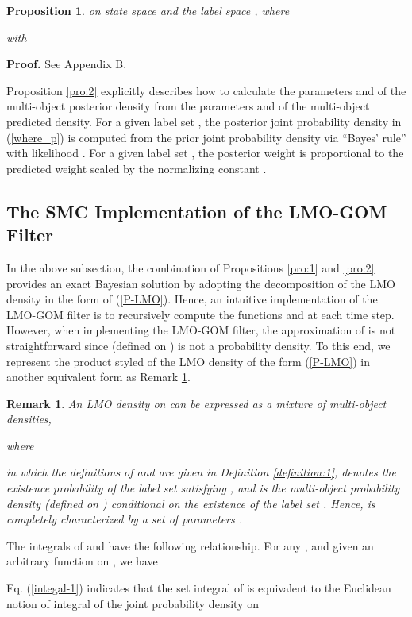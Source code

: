 \documentclass[journal]{IEEEtran}
\newtheorem{Pro}{Proposition}
\newtheorem{Rem}{Remark}
\newcommand{\proproof}[1]{\noindent\textbf{Proof. } See Appendix #1.}
\begin{document}
{\begin{Pro}
on state space  and the label space ,
where
 
with
   
\end{Pro}

\proproof{B}

Proposition \ref{pro:2} explicitly describes how to calculate the parameters  and   of the  multi-object posterior density from the parameters  and  of the multi-object  predicted   density. For a given label set , the posterior joint probability density  in (\ref{where_p}) is computed from the prior joint probability density     via ``Bayes' rule'' with likelihood . For a given label set , the posterior weight  is  proportional to the predicted weight   scaled by the normalizing constant .


 \subsection{The SMC Implementation of the LMO-GOM Filter}
In the above subsection, the combination of Propositions \ref{pro:1} and \ref{pro:2} provides an exact Bayesian solution  by adopting the decomposition of  the LMO  density  in the form of (\ref{P-LMO}). Hence, an intuitive  implementation of the LMO-GOM filter is to recursively compute the functions  and  at each time step. However, when implementing the LMO-GOM filter,   the  approximation of     is not straightforward since   (defined on ) is not a probability density.  To this end, we  represent the product styled of the LMO density of the form (\ref{P-LMO}) in another equivalent form  as  Remark \ref{mixture-LMO}.
\begin{Rem}\label{mixture-LMO}
An LMO density   on  can be expressed as a mixture of multi-object densities, 

where

in which the definitions of  and  are given in Definition \ref{definition:1}, 
 denotes the  existence probability of the label set  satisfying , and   is the multi-object probability density (defined on ) conditional on the existence of the label set  . Hence,  is completely characterized by a set of parameters .
\end{Rem}



The integrals of  and  have the following relationship. For any , and given an arbitrary function  on , we have

Eq. (\ref{integal-1}) indicates that the set integral of  is equivalent to  the Euclidean notion of integral of the joint probability density  on  


}
\end{document}
